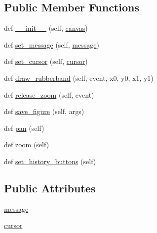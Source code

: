 \subsection*{Public Member Functions}
\begin{DoxyCompactItemize}
\item 
def \hyperlink{classmatplotlib_1_1backends_1_1backend__webagg__core_1_1NavigationToolbar2WebAgg_aefca67226e516ce247f4df6f390e51c1}{\+\_\+\+\_\+init\+\_\+\+\_\+} (self, \hyperlink{classmatplotlib_1_1backend__bases_1_1NavigationToolbar2_a1a87a34e3a87d05f78fffea401c5a362}{canvas})
\item 
def \hyperlink{classmatplotlib_1_1backends_1_1backend__webagg__core_1_1NavigationToolbar2WebAgg_a1bc783048f71042c6a4390153213e0c6}{set\+\_\+message} (self, \hyperlink{classmatplotlib_1_1backends_1_1backend__webagg__core_1_1NavigationToolbar2WebAgg_a7596a1f4a668afbe894549bb13d7571d}{message})
\item 
def \hyperlink{classmatplotlib_1_1backends_1_1backend__webagg__core_1_1NavigationToolbar2WebAgg_a55a86f9faccfe47b02bbbadfcd16844b}{set\+\_\+cursor} (self, \hyperlink{classmatplotlib_1_1backends_1_1backend__webagg__core_1_1NavigationToolbar2WebAgg_ade7c46f9c38237cd202417d59c5ba8ae}{cursor})
\item 
def \hyperlink{classmatplotlib_1_1backends_1_1backend__webagg__core_1_1NavigationToolbar2WebAgg_a51f45f2491095b18165ceb508c8abd9e}{draw\+\_\+rubberband} (self, event, x0, y0, x1, y1)
\item 
def \hyperlink{classmatplotlib_1_1backends_1_1backend__webagg__core_1_1NavigationToolbar2WebAgg_a8ce0e6c521d3df4a5000ba2f71c43894}{release\+\_\+zoom} (self, event)
\item 
def \hyperlink{classmatplotlib_1_1backends_1_1backend__webagg__core_1_1NavigationToolbar2WebAgg_a1573a81f3e842d6eae46f02ea4fc900b}{save\+\_\+figure} (self, args)
\item 
def \hyperlink{classmatplotlib_1_1backends_1_1backend__webagg__core_1_1NavigationToolbar2WebAgg_ae413a21c7b4649a013ede97d76d2137a}{pan} (self)
\item 
def \hyperlink{classmatplotlib_1_1backends_1_1backend__webagg__core_1_1NavigationToolbar2WebAgg_a71eed807d8bce01321be487b677c7123}{zoom} (self)
\item 
def \hyperlink{classmatplotlib_1_1backends_1_1backend__webagg__core_1_1NavigationToolbar2WebAgg_a06779c449551137c37f7460c65e9b68f}{set\+\_\+history\+\_\+buttons} (self)
\end{DoxyCompactItemize}
\subsection*{Public Attributes}
\begin{DoxyCompactItemize}
\item 
\hyperlink{classmatplotlib_1_1backends_1_1backend__webagg__core_1_1NavigationToolbar2WebAgg_a7596a1f4a668afbe894549bb13d7571d}{message}
\item 
\hyperlink{classmatplotlib_1_1backends_1_1backend__webagg__core_1_1NavigationToolbar2WebAgg_ade7c46f9c38237cd202417d59c5ba8ae}{cursor}
\end{DoxyCompactItemize}
